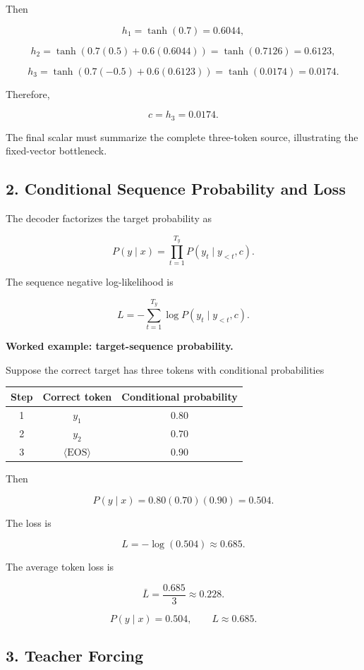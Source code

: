 \documentclass[11pt,a4paper,twoside]{article}
\begin{document}
Then

\[
h_1=\tanh(0.7)=0.6044,
\]

\[
h_2=\tanh(0.7(0.5)+0.6(0.6044))
=\tanh(0.7126)
=0.6123,
\]

\[
h_3=\tanh(0.7(-0.5)+0.6(0.6123))
=\tanh(0.0174)
=0.0174.
\]

Therefore,

\[
\boxed{c=h_3=0.0174.}
\]

The final scalar must summarize the complete three-token source, illustrating the fixed-vector bottleneck.

\subsection*{2. Conditional Sequence Probability and Loss}

The decoder factorizes the target probability as

\[
\boxed{
P(y\mid x)=\prod_{t=1}^{T_y}P(y_t\mid y_{<t},c)
}.
\]

The sequence negative log-likelihood is

\[
\boxed{
L=-\sum_{t=1}^{T_y}\log P(y_t\mid y_{<t},c)
}.
\]

\textbf{Worked example: target-sequence probability.}

Suppose the correct target has three tokens with conditional probabilities

\begin{center}
\begin{tabular}{c|c|c}
\toprule
Step&Correct token&Conditional probability\\ \midrule
1&$y_1$&$0.80$\\
2&$y_2$&$0.70$\\
3&$\langle\mathrm{EOS}\rangle$&$0.90$\\ \bottomrule
\end{tabular}
\end{center}

Then

\[
P(y\mid x)=0.80(0.70)(0.90)=0.504.
\]

The loss is

\[
L=-\log(0.504)\approx0.685.
\]

The average token loss is

\[
\bar L=\frac{0.685}{3}\approx0.228.
\]

\[
\boxed{P(y\mid x)=0.504,\qquad L\approx0.685.}
\]

\subsection*{3. Teacher Forcing}
\end{document}
